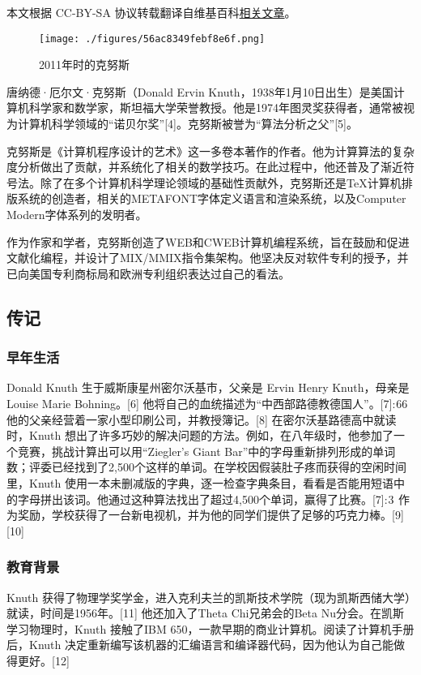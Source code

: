 
本文根据 CC-BY-SA 协议转载翻译自维基百科\href{https://en.wikipedia.org/wiki/Donald_Knuth}{相关文章}。

\begin{figure}[ht]
\centering
\texttt{[image: ./figures/56ac8349febf8e6f.png]}
\caption{2011年时的克努斯} \label{fig_GDN_1}
\end{figure}
唐纳德·厄尔文·克努斯（Donald Ervin Knuth，1938年1月10日出生）是美国计算机科学家和数学家，斯坦福大学荣誉教授。他是1974年图灵奖获得者，通常被视为计算机科学领域的“诺贝尔奖”[4]。克努斯被誉为“算法分析之父”[5]。

克努斯是《计算机程序设计的艺术》这一多卷本著作的作者。他为计算算法的复杂度分析做出了贡献，并系统化了相关的数学技巧。在此过程中，他还普及了渐近符号法。除了在多个计算机科学理论领域的基础性贡献外，克努斯还是TeX计算机排版系统的创造者，相关的METAFONT字体定义语言和渲染系统，以及Computer Modern字体系列的发明者。

作为作家和学者，克努斯创造了WEB和CWEB计算机编程系统，旨在鼓励和促进文献化编程，并设计了MIX/MMIX指令集架构。他坚决反对软件专利的授予，并已向美国专利商标局和欧洲专利组织表达过自己的看法。
\subsection{传记} 
\subsubsection{早年生活}  
Donald Knuth 生于威斯康星州密尔沃基市，父亲是 Ervin Henry Knuth，母亲是 Louise Marie Bohning。[6] 他将自己的血统描述为“中西部路德教德国人”。[7]: 66  他的父亲经营着一家小型印刷公司，并教授簿记。[8] 在密尔沃基路德高中就读时，Knuth 想出了许多巧妙的解决问题的方法。例如，在八年级时，他参加了一个竞赛，挑战计算出可以用“Ziegler's Giant Bar”中的字母重新排列形成的单词数；评委已经找到了2,500个这样的单词。在学校因假装肚子疼而获得的空闲时间里，Knuth 使用一本未删减版的字典，逐一检查字典条目，看看是否能用短语中的字母拼出该词。他通过这种算法找出了超过4,500个单词，赢得了比赛。[7]: 3  作为奖励，学校获得了一台新电视机，并为他的同学们提供了足够的巧克力棒。[9][10]  
\subsubsection{教育背景}  
Knuth 获得了物理学奖学金，进入克利夫兰的凯斯技术学院（现为凯斯西储大学）就读，时间是1956年。[11] 他还加入了Theta Chi兄弟会的Beta Nu分会。在凯斯学习物理时，Knuth 接触了IBM 650，一款早期的商业计算机。阅读了计算机手册后，Knuth 决定重新编写该机器的汇编语言和编译器代码，因为他认为自己能做得更好。[12]  

